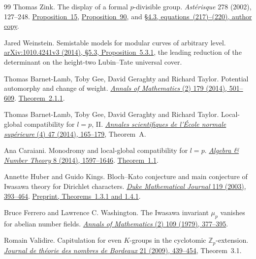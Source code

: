 \begin{thebibliography}{99}
Thomas Zink.
The display of a formal \(p\)-divisible group.
\emph{Astérisque} 278 (2002), 127--248.
\href{https://www.math.uni-bielefeld.de/~zink/display.pdf\#page=16}
{Proposition~15}, \href{https://www.math.uni-bielefeld.de/~zink/display.pdf\#page=83}
{Proposition~90}, and \href{https://www.math.uni-bielefeld.de/~zink/display.pdf\#page=110}
{\S4.3, equations~(217)--(220), author copy}.

Jared Weinstein.
Semistable models for modular curves of arbitrary level.
\href{https://arxiv.org/pdf/1010.4241v3\#page=44}
{arXiv:1010.4241v3 (2014), \S5.3, Proposition~5.3.1},
the leading reduction of the determinant on the height-two Lubin--Tate universal cover.

Thomas Barnet-Lamb, Toby Gee, David Geraghty and Richard Taylor.
Potential automorphy and change of weight.
\href{https://doi.org/10.4007/annals.2014.179.2.3}
{\emph{Annals of Mathematics} (2) 179 (2014), 501--609}.
\href{https://annals.math.princeton.edu/wp-content/uploads/annals-v179-n2-p03-p.pdf}
{Theorem~2.1.1}.

Thomas Barnet-Lamb, Toby Gee, David Geraghty and Richard Taylor.
Local-global compatibility for \(l=p\), II.
\href{https://www.numdam.org/articles/10.24033/asens.2212/}
{\emph{Annales scientifiques de l'\'Ecole normale sup\'erieure}
(4) 47 (2014), 165--179}, Theorem~A.

Ana Caraiani.
Monodromy and local-global compatibility for \(l=p\).
\href{https://doi.org/10.2140/ant.2014.8.1597}
{\emph{Algebra \& Number Theory} 8 (2014), 1597--1646}.
\href{https://msp.org/ant/2014/8-7/ant-v8-n7-p02-s.pdf}
{Theorem~1.1}.

Annette Huber and Guido Kings.
Bloch--Kato conjecture and main conjecture of Iwasawa theory for
Dirichlet characters.
\href{https://doi.org/10.1215/S0012-7094-03-11931-6}
{\emph{Duke Mathematical Journal} 119 (2003), 393--464}.
\href{https://arxiv.org/pdf/math/0101071v2\#page=13}
{Preprint, Theorems~1.3.1 and 1.4.1}.

Bruce Ferrero and Lawrence C. Washington.
The Iwasawa invariant \(\mu_p\) vanishes for abelian number fields.
\href{https://www.jstor.org/stable/1971116}
{\emph{Annals of Mathematics} (2) 109 (1979), 377--395}.

Romain Validire.
Capitulation for even \(K\)-groups in the cyclotomic
\(\mathbb Z_p\)-extension.
\href{https://www.numdam.org/articles/10.5802/jtnb.681/}
{\emph{Journal de th\'eorie des nombres de Bordeaux} 21 (2009), 439--454},
Theorem~3.1.


\end{thebibliography}
